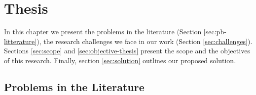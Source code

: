
\chapter{Thesis\label{chap:thesis}}

In this chapter we present the problems in the literature (Section \ref{sec:pb-litterature}), the research challenges we face in our work (Section \ref{sec:challenges}). Sections \ref{sec:scope} and \ref{sec:objective-thesis} present the scope and the objectives of this research. Finally, section \ref{sec:solution} outlines our proposed solution.

\section{Problems in the Literature\label{sec:pb-litterature}}


